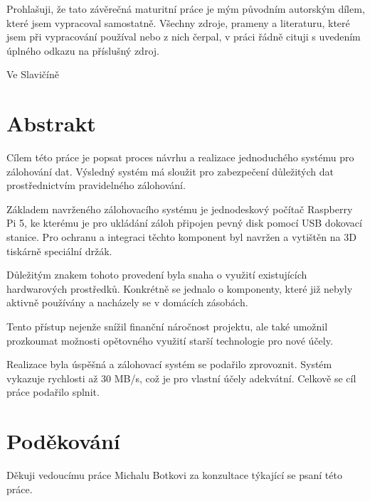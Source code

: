 \documentclass[a4paper,12pt, oneside]{book}
\makeatletter
\let\newauthor\@author
\let\newdate\@date
\makeatother
\begin{document}
\newpage


\noindent

Prohlašuji, že tato závěrečná maturitní práce je mým původním autorským dílem,
které jsem vypracoval samostatně. Všechny zdroje, prameny a literaturu, které
jsem při vypracování používal nebo z nich čerpal, v práci řádně cituji
s uvedením úplného odkazu na příslušný zdroj.

\begin{center}
Ve Slavičíně

\newdate

\vspace{10mm}

\newauthor
\end{center}

\newpage
\section*{Abstrakt}

Cílem této práce je popsat proces návrhu a realizace jednoduchého
systému pro zálohování dat. Výsledný systém má sloužit pro zabezpečení důležitých
dat prostřednictvím pravidelného zálohování.

Základem navrženého zálohovacího systému je jednodeskový počítač Rasp\-berry Pi 5,
ke kterému je pro ukládání záloh připojen pevný disk pomocí USB
dokovací stanice. Pro ochranu a integraci těchto komponent byl navržen a
vytištěn na 3D tiskárně speciální držák. 

Důležitým znakem tohoto provedení byla snaha o využití existujících
hardwarových prostředků. Konkrétně se jednalo o komponenty, které již nebyly
aktivně používány a nacházely se v domácích zásobách.

Tento přístup nejenže snížil finanční náročnost projektu, ale také umožnil
prozkoumat možnosti opětovného využití starší technologie pro nové účely.

Realizace byla úspěšná a zálohovací systém se podařilo zprovoznit. Systém
vykazuje rychlosti až 30 MB/s, což je pro vlastní účely adekvátní. Celkově 
se cíl práce podařilo splnit.

\newpage
\section*{Poděkování}

Děkuji vedoucímu práce Michalu Botkovi za konzultace týkající 
se psaní této práce. 
\end{document}
